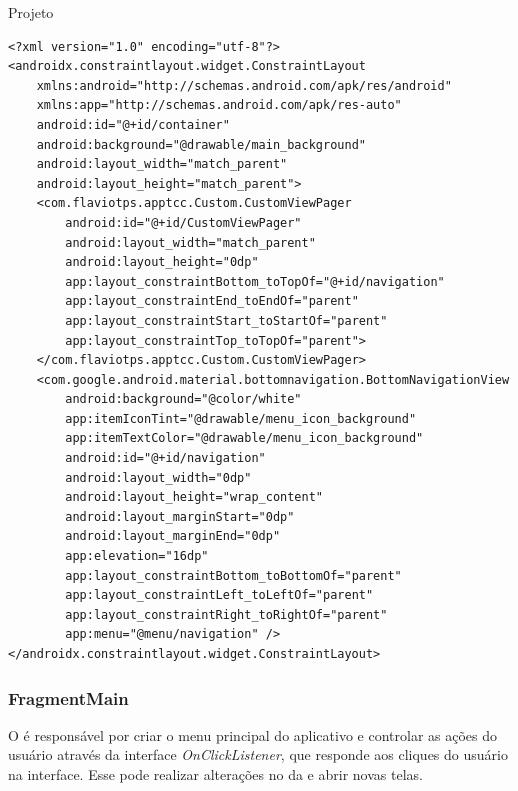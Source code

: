 \documentclass[
	12pt,				%
	openright,			%
	twoside,			%
	a4paper,			%
	english,			%
	french,				%
	spanish,			%
	brazil				%
	]{abntex2}
\begin{document}
\begin{chapter}{Projeto}
\newpage
\begin{lstlisting}[numbers=none,
basicstyle=\small,
caption={Tela Principal.xml},
title={Tela Principal.xml},
label={activity_main.xml}]
<?xml version="1.0" encoding="utf-8"?>
<androidx.constraintlayout.widget.ConstraintLayout
    xmlns:android="http://schemas.android.com/apk/res/android"
    xmlns:app="http://schemas.android.com/apk/res-auto"
    android:id="@+id/container"
    android:background="@drawable/main_background"
    android:layout_width="match_parent"
    android:layout_height="match_parent">
    <com.flaviotps.apptcc.Custom.CustomViewPager
        android:id="@+id/CustomViewPager"
        android:layout_width="match_parent"
        android:layout_height="0dp"
        app:layout_constraintBottom_toTopOf="@+id/navigation"
        app:layout_constraintEnd_toEndOf="parent"
        app:layout_constraintStart_toStartOf="parent"
        app:layout_constraintTop_toTopOf="parent">
    </com.flaviotps.apptcc.Custom.CustomViewPager>
    <com.google.android.material.bottomnavigation.BottomNavigationView
        android:background="@color/white"
        app:itemIconTint="@drawable/menu_icon_background"
        app:itemTextColor="@drawable/menu_icon_background"
        android:id="@+id/navigation"
        android:layout_width="0dp"
        android:layout_height="wrap_content"
        android:layout_marginStart="0dp"
        android:layout_marginEnd="0dp"
        app:elevation="16dp"
        app:layout_constraintBottom_toBottomOf="parent"
        app:layout_constraintLeft_toLeftOf="parent"
        app:layout_constraintRight_toRightOf="parent"
        app:menu="@menu/navigation" />
</androidx.constraintlayout.widget.ConstraintLayout>
\end{lstlisting}

\newpage
\subsubsection{FragmentMain} \label{main_fragment}
O  é responsável por criar o menu principal do aplicativo e controlar as ações do usuário através da interface \textit{OnClickListener}, que responde aos cliques do usuário na interface. Esse  pode realizar alterações no  da  e abrir novas telas.


\end{chapter}
\end{document}

